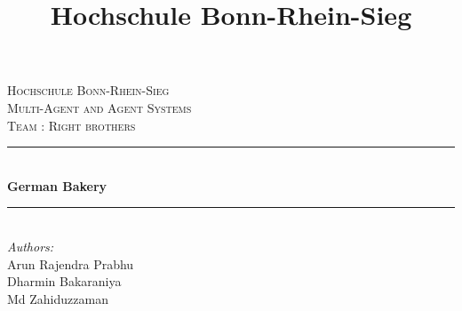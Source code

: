 \documentclass[12pt]{article}
\title{Hochschule Bonn-Rhein-Sieg}
\begin{document}
\begin{titlepage}

\newcommand{\HRule}{\rule{\linewidth}{0.5mm}} %

\begin{center}
\textsc{\LARGE Hochschule Bonn-Rhein-Sieg}\\[1.5cm] %
\textsc{\Large Multi-Agent and Agent Systems}\\[0.5cm] %
\textsc{\large Team : Right brothers}\\[0.5cm] %

\HRule \\[0.4cm]
{ \huge \bfseries German Bakery}\\[0.4cm] %
\HRule \\[1.5cm]
 

\large\emph{Authors:}\\ Arun Rajendra Prabhu\\ Dharmin Bakaraniya\\ Md Zahiduzzaman\\[1.0cm]%




\end{center}
\end{titlepage}
\end{document}
